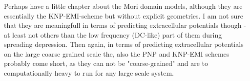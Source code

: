 \subsubsection{}
Perhaps have a little chapter about the Mori domain models, although they are essentially the KNP-EMI-scheme but without explicit geometries. I am not sure that they are meaningfull in terms of predicting extracellular potentials though - at least not others than the low frequency (DC-like) part of them during spreading depression. Then again, in terms of predicting extracellular potentials on the large coarse grained scale the, also the PNP and KNP-EMI schemes probably come short, as they can not be "coarse-grained" and are to computationally heavy to run for any large scale system. 



